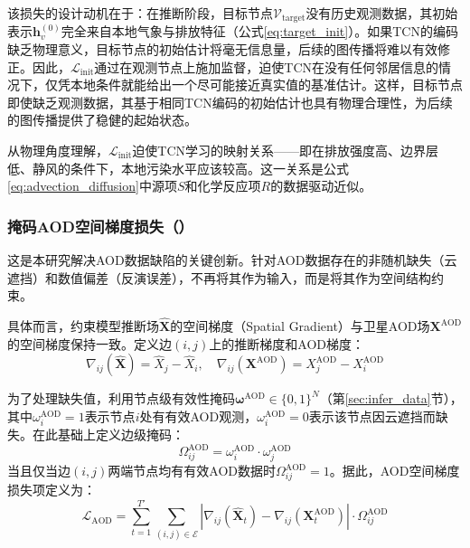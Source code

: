 该损失的设计动机在于：在推断阶段，目标节点$\mathcal{V}_{\text{target}}$没有历史观测数据，其初始表示$\mathbf{h}_v^{(0)}$完全来自本地气象与排放特征（公式\eqref{eq:target_init}）。如果TCN的编码缺乏物理意义，目标节点的初始估计将毫无信息量，后续的图传播将难以有效修正。因此，$\mathcal{L}_{\mathrm{init}}$通过在观测节点上施加监督，迫使TCN在没有任何邻居信息的情况下，仅凭本地条件就能给出一个尽可能接近真实值的基准估计。这样，目标节点即使缺乏观测数据，其基于相同TCN编码的初始估计也具有物理合理性，为后续的图传播提供了稳健的起始状态。

从物理角度理解，$\mathcal{L}_{\mathrm{init}}$迫使TCN学习的映射关系——即在排放强度高、边界层低、静风的条件下，本地污染水平应该较高。这一关系是公式\eqref{eq:advection_diffusion}中源项$S$和化学反应项$R$的数据驱动近似。


\subsubsection[掩码AOD空间梯度损失（\texorpdfstring{\LossAOD}{L\_AOD}）]{掩码AOD空间梯度损失（\LossAOD）}

这是本研究解决AOD数据缺陷的关键创新。针对AOD数据存在的非随机缺失（云遮挡）和数值偏差（反演误差），不再将其作为输入，而是将其作为空间结构约束。

具体而言，约束模型推断场$\hat{\mathbf{X}}$的空间梯度（Spatial Gradient）与卫星AOD场$\mathbf{X}^{\text{AOD}}$的空间梯度保持一致。定义边$(i, j)$上的推断梯度和AOD梯度：
\begin{equation}
\nabla_{ij}(\hat{\mathbf{X}}) = \hat{X}_j - \hat{X}_i, \quad \nabla_{ij}(\mathbf{X}^{\text{AOD}}) = X_j^{\text{AOD}} - X_i^{\text{AOD}}
\label{eq:gradient_definition}
\end{equation}

为了处理缺失值，利用节点级有效性掩码$\boldsymbol{\omega}^{\text{AOD}} \in \{0,1\}^{N}$（第\ref{sec:infer_data}节），其中$\omega_i^{\text{AOD}} = 1$表示节点$i$处有有效AOD观测，$\omega_i^{\text{AOD}} = 0$表示该节点因云遮挡而缺失。在此基础上定义边级掩码：
\begin{equation}
\Omega_{ij}^{\text{AOD}} = \omega_i^{\text{AOD}} \cdot \omega_j^{\text{AOD}}
\label{eq:aod_mask}
\end{equation}
\noindent 当且仅当边$(i,j)$两端节点均有有效AOD数据时$\Omega_{ij}^{\text{AOD}} = 1$。据此，AOD空间梯度损失项定义为：
\begin{equation}
    \mathcal{L}_{\mathrm{AOD}} = \sum_{t=1}^{T'} \sum_{(i,j) \in \mathcal{E}} \left| \nabla_{ij}(\hat{\mathbf{X}}_t) - \nabla_{ij}(\mathbf{X}^{\text{AOD}}_t) \right| \cdot \Omega_{ij}^{\text{AOD}}
\label{eq:aod_loss}
\end{equation}

